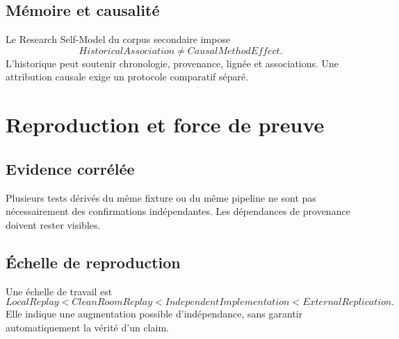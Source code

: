 \section{Mémoire et causalité}
Le Research Self-Model du corpus secondaire impose
\[
HistoricalAssociation\neq CausalMethodEffect.
\]
L'historique peut soutenir chronologie, provenance, lignée et associations. Une attribution causale exige un protocole comparatif séparé.

\chapter{Reproduction et force de preuve}

\section{Evidence corrélée}
Plusieurs tests dérivés du même fixture ou du même pipeline ne sont pas nécessairement des confirmations indépendantes. Les dépendances de provenance doivent rester visibles.

\section{Échelle de reproduction}
Une échelle de travail est
\[
LocalReplay < CleanRoomReplay < IndependentImplementation < ExternalReplication.
\]
Elle indique une augmentation possible d'indépendance, sans garantir automatiquement la vérité d'un claim.
